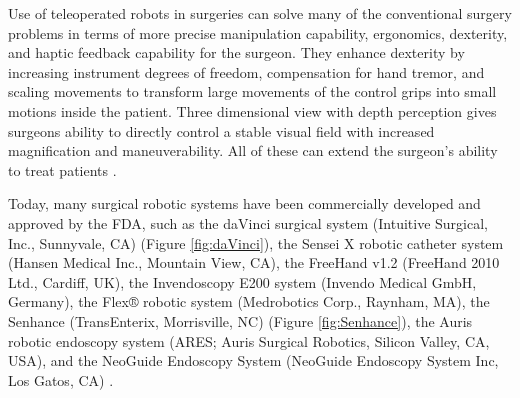 

Use of teleoperated robots in surgeries can solve many of the conventional surgery problems in terms of more precise manipulation capability, ergonomics, dexterity, and haptic feedback capability for the surgeon. They enhance dexterity by increasing instrument degrees of freedom, compensation for hand tremor, and scaling movements to transform large movements of the control grips into small motions inside the patient. Three dimensional view with depth perception gives surgeons ability to directly control a stable visual field with increased magnification and maneuverability. All of these can extend the surgeon's ability to treat patients \cite{tavakoli_haptics_2008}.

Today, many surgical robotic systems have been commercially developed and approved by the FDA, such as the daVinci surgical system (Intuitive Surgical, Inc., Sunnyvale, CA) (Figure \ref{fig:daVinci}), the Sensei X robotic catheter system (Hansen Medical Inc., Mountain View, CA), the FreeHand v1.2 (FreeHand 2010 Ltd., Cardiff, UK), the Invendoscopy E200 system (Invendo Medical GmbH, Germany), the Flex® robotic system (Medrobotics Corp., Raynham, MA), the Senhance (TransEnterix, Morrisville, NC) (Figure \ref{fig:Senhance}), the Auris robotic endoscopy system (ARES; Auris Surgical Robotics, Silicon Valley, CA, USA), and the NeoGuide Endoscopy System (NeoGuide Endoscopy System Inc, Los Gatos, CA) \cite{lanfranco_robotic_2004,peters_review_2018}.

